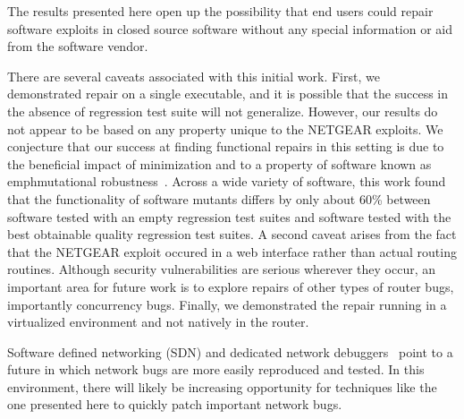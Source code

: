 \documentclass{sigcomm-alternate}
\begin{document}
The results presented here open up the possibility that end users
could repair software exploits in closed source software without any
special information or aid from the software vendor.  

There are several caveats associated with this initial work.
First, we demonstrated repair on a single executable, and it is possible
that the success in the absence of regression test suite will not
generalize.  However, our results do not appear to be based on any
property unique to the NETGEAR exploits.  We conjecture that our
success at finding functional repairs in this setting is due to the
beneficial impact of minimization and to a property of software known
as \\emph{mutational robustness}~\cite{schulte2013software}.  Across a
wide variety of software, this work found that the functionality of
software mutants differs by only about 60\% between software tested
with an empty regression test suites and software tested with the best
obtainable quality regression test suites.  A second caveat arises
from the fact that the NETGEAR exploit occured in a web interface
rather than actual routing routines.  Although security
vulnerabilities are serious wherever they occur, an important
area for future work is to explore repairs of other types of router
bugs, importantly concurrency bugs.  Finally, we demonstrated the
repair running in a virtualized environment and not natively in the
router.  

Software defined networking (SDN) and dedicated network
debuggers~\cite{handigol2012debugger} point to a future in which
network bugs are more easily reproduced and tested.  In this
environment, there will likely be increasing opportunity for techniques
like the one presented here to quickly patch important network bugs.

\end{document}
